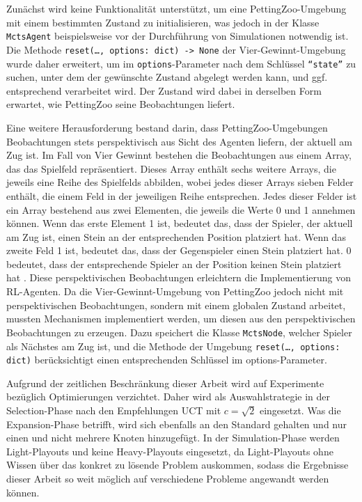 Zunächst wird keine Funktionalität unterstützt, um eine PettingZoo-Umgebung mit einem bestimmten Zustand zu initialisieren, was jedoch in der Klasse \texttt{MctsAgent} beispielsweise vor der Durchführung von Simulationen notwendig ist. Die Methode \texttt{reset(…, options: dict) -> None} der Vier-Gewinnt-Umgebung wurde daher erweitert, um im \texttt{options}-Parameter nach dem Schlüssel \texttt{``state''} zu suchen, unter dem der gewünschte Zustand abgelegt werden kann, und ggf. entsprechend verarbeitet wird. Der Zustand wird dabei in derselben Form erwartet, wie PettingZoo seine Beobachtungen liefert.

Eine weitere Herausforderung bestand darin, dass PettingZoo-Umgebungen Beobachtungen stets perspektivisch aus Sicht des Agenten liefern, der aktuell am Zug ist. Im Fall von Vier Gewinnt bestehen die Beobachtungen aus einem Array, das das Spielfeld repräsentiert. Dieses Array enthält sechs weitere Arrays, die jeweils eine Reihe des Spielfelds abbilden, wobei jedes dieser Arrays sieben Felder enthält, die einem Feld in der jeweiligen Reihe entsprechen. Jedes dieser Felder ist ein Array bestehend aus zwei Elementen, die jeweils die Werte 0 und 1 annehmen können. Wenn das erste Element 1 ist, bedeutet das, dass der Spieler, der aktuell am Zug ist, einen Stein an der entsprechenden Position platziert hat. Wenn das zweite Feld 1 ist, bedeutet das, dass der Gegenspieler einen Stein platziert hat. 0 bedeutet, dass der entsprechende Spieler an der Position keinen Stein platziert hat \cite{Farama.2025}. Diese perspektivischen Beobachtungen erleichtern die Implementierung von RL-Agenten. Da die Vier-Gewinnt-Umgebung von PettingZoo jedoch nicht mit perspektivischen Beobachtungen, sondern mit einem globalen Zustand arbeitet, mussten Mechanismen implementiert werden, um diesen aus den perspektivischen Beobachtungen zu erzeugen. Dazu speichert die Klasse \texttt{MctsNode}, welcher Spieler als Nächstes am Zug ist, und die Methode der Umgebung \texttt{reset(…, options: dict)} berücksichtigt einen entsprechenden Schlüssel im options-Parameter.

Aufgrund der zeitlichen Beschränkung dieser Arbeit wird auf Experimente bezüglich Optimierungen verzichtet. Daher wird als Auswahlstrategie in der Selection-Phase nach den Empfehlungen UCT mit $c=\sqrt{2}$ eingesetzt. Was die Expansion-Phase betrifft, wird sich ebenfalls an den Standard gehalten und nur einen und nicht mehrere Knoten hinzugefügt. In der Simulation-Phase werden Light-Playouts und keine Heavy-Playouts eingesetzt, da Light-Playouts ohne Wissen über das konkret zu lösende Problem auskommen, sodass die Ergebnisse dieser Arbeit so weit möglich auf verschiedene Probleme angewandt werden können.

